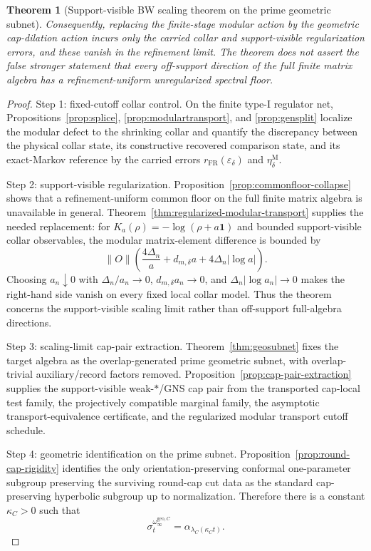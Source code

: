 \documentclass[11pt]{article}
\newtheorem{theorem}{Theorem}[section]
\begin{document}
\begin{theorem}[Support-visible BW scaling theorem on the prime geometric subnet]
Consequently, replacing the finite-stage modular action by the geometric cap-dilation action incurs only the carried collar and support-visible regularization errors, and these vanish in the refinement limit. The theorem does not assert the false stronger statement that every off-support direction of the full finite matrix algebra has a refinement-uniform unregularized spectral floor.
\end{theorem}

\begin{proof}
Step 1: fixed-cutoff collar control. On the finite type-I regulator net, Propositions~\ref{prop:splice}, \ref{prop:modulartransport}, and \ref{prop:gensplit} localize the modular defect to the shrinking collar and quantify the discrepancy between the physical collar state, its constructive recovered comparison state, and its exact-Markov reference by the carried errors \(r_{\mathrm{FR}}(\varepsilon_\delta)\) and \(\eta_\delta^{\mathrm M}\).

Step 2: support-visible regularization. Proposition~\ref{prop:commonfloor-collapse} shows that a refinement-uniform common floor on the full finite matrix algebra is unavailable in general. Theorem~\ref{thm:regularized-modular-transport} supplies the needed replacement: for \(K_a(\rho)=-\log(\rho+a\mathbf1)\) and bounded support-visible collar observables, the modular matrix-element difference is bounded by
\[
\|O\|\left(\frac{4\Delta_n}{a}+d_{m,\delta}a+4\Delta_n|\log a|\right).
\]
Choosing \(a_n\downarrow0\) with \(\Delta_n/a_n\to0\), \(d_{m,\delta}a_n\to0\), and \(\Delta_n|\log a_n|\to0\) makes the right-hand side vanish on every fixed local collar model. Thus the theorem concerns the support-visible scaling limit rather than off-support full-algebra directions.

Step 3: scaling-limit cap-pair extraction. Theorem~\ref{thm:geosubnet} fixes the target algebra as the overlap-generated prime geometric subnet, with overlap-trivial auxiliary/record factors removed. Proposition~\ref{prop:cap-pair-extraction} supplies the support-visible weak-\(*\)/GNS cap pair from the transported cap-local test family, the projectively compatible marginal family, the asymptotic transport-equivalence certificate, and the regularized modular transport cutoff schedule.

Step 4: geometric identification on the prime subnet. Proposition~\ref{prop:round-cap-rigidity} identifies the only orientation-preserving conformal one-parameter subgroup preserving the surviving round-cap cut data as the standard cap-preserving hyperbolic subgroup up to normalization. Therefore there is a constant \(\kappa_C>0\) such that
\[
\sigma_t^{\omega_\infty^{\mathrm{geo},C}}=\alpha_{\lambda_C(\kappa_C t)}.
\]


\end{proof}
\end{document}
